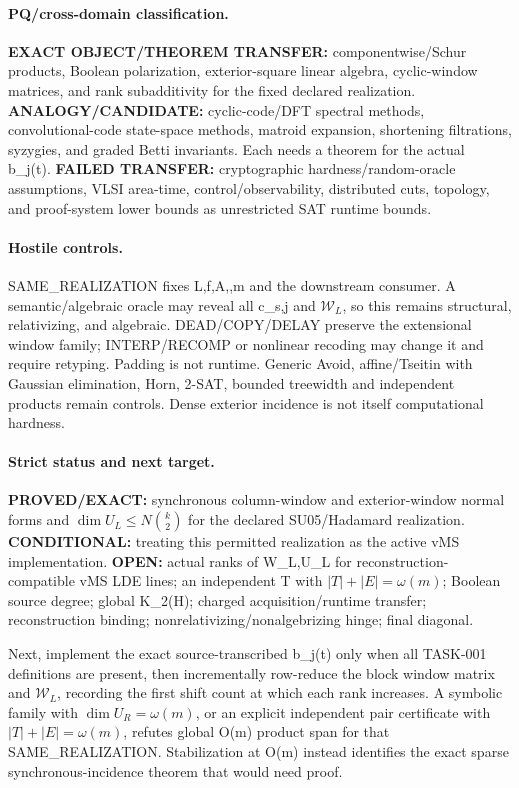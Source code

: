 \documentclass[11pt]{article}
\begin{document}
\paragraph{PQ/cross-domain classification.}
\textbf{EXACT OBJECT/THEOREM TRANSFER:} componentwise/Schur products, Boolean polarization, exterior-square linear algebra, cyclic-window matrices, and rank subadditivity for the fixed declared realization.
\textbf{ANALOGY/CANDIDATE:} cyclic-code/DFT spectral methods, convolutional-code state-space methods, matroid expansion, shortening filtrations, syzygies, and graded Betti invariants. Each needs a theorem for the actual b_j(t).
\textbf{FAILED TRANSFER:} cryptographic hardness/random-oracle assumptions, VLSI area-time, control/observability, distributed cuts, topology, and proof-system lower bounds as unrestricted SAT runtime bounds.

\paragraph{Hostile controls.}
SAME_REALIZATION fixes L,f,A,\kappa,m and the downstream consumer. A semantic/algebraic oracle may reveal all c_{s,j} and \(\mathcal W_L\), so this remains structural, relativizing, and algebraic. DEAD/COPY/DELAY preserve the extensional window family; INTERP/RECOMP or nonlinear recoding may change it and require retyping. Padding is not runtime. Generic Avoid, affine/Tseitin with Gaussian elimination, Horn, 2-SAT, bounded treewidth and independent products remain controls. Dense exterior incidence is not itself computational hardness.

\paragraph{Strict status and next target.}
\textbf{PROVED/EXACT:} synchronous column-window and exterior-window normal forms and \(\dim U_L\le N\binom{k}{2}\) for the declared SU05/Hadamard realization.
\textbf{CONDITIONAL:} treating this permitted realization as the active vMS implementation.
\textbf{OPEN:} actual ranks of W_L,U_L for reconstruction-compatible vMS LDE lines; an independent T with \(|T|+|E|=\omega(m)\); Boolean source degree; global K_2(H); charged acquisition/runtime transfer; reconstruction binding; nonrelativizing/nonalgebrizing hinge; final diagonal.

Next, implement the exact source-transcribed b_j(t) only when all TASK-001 definitions are present, then incrementally row-reduce the block window matrix and \(\mathcal W_L\), recording the first shift count at which each rank increases. A symbolic family with \(\dim U_R=\omega(m)\), or an explicit independent pair certificate with \(|T|+|E|=\omega(m)\), refutes global O(m) product span for that SAME_REALIZATION. Stabilization at O(m) instead identifies the exact sparse synchronous-incidence theorem that would need proof.
\end{document}
